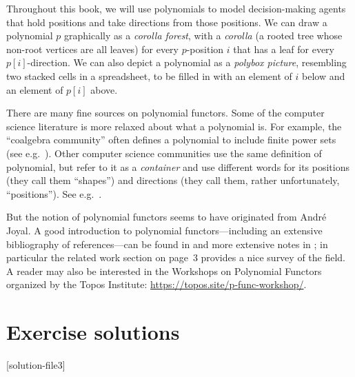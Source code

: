 \documentclass[Book-Poly]{subfiles}
\begin{document}

Throughout this book, we will use polynomials to model decision-making agents that hold positions and take directions from those positions.
We can draw a polynomial $p$ graphically as a \emph{corolla forest}, with a \emph{corolla} (a rooted tree whose non-root vertices are all leaves) for every $p$-position $i$ that has a leaf for every $p[i]$-direction.
We can also depict a polynomial as a \emph{polybox picture}, resembling two stacked cells in a spreadsheet, to be filled in with an element of $i$ below and an element of $p[i]$ above.


There are many fine sources on polynomial functors. Some of the computer science literature is more relaxed about what a polynomial is. For example, the ``coalgebra community'' often defines a polynomial to include finite power sets (see e.g.\ \cite{jacobs2017introduction}). Other computer science communities use the same definition of polynomial, but refer to it as a \emph{container} and use different words for its positions (they call them ``shapes'') and directions (they call them, rather unfortunately, ``positions''). See e.g.\ \cite{abbot2003categoriesthesis,abbott2005containers}.


But the notion of polynomial functors seems to have originated from Andr\'{e} Joyal. A good introduction to polynomial functors---including an extensive bibliography of references---can be found in \cite{kock2012polynomial} and more extensive notes in \cite{kock2016}; in particular the related work section on page~3 provides a nice survey of the field. A reader may also be interested in the Workshops on Polynomial Functors organized by the Topos Institute: \url{https://topos.site/p-func-workshop/}.


\section{Exercise solutions}
{\footnotesize
    }

[solution-file3]
\end{document}
